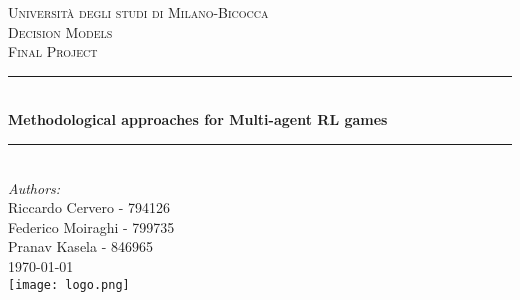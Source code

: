 \begin{titlepage}

\newcommand{\HRule}{\rule{\linewidth}{0.5mm}} %

\center %
 

\textsc{\LARGE Università degli studi di Milano-Bicocca}\\[1cm] %
\textsc{\Large Decision Models}\\[0.3cm] %
\textsc{\large Final Project}\\[0.1cm] %


\HRule \\[0.4cm]
{ \huge \bfseries Methodological approaches for Multi-agent RL games}\\[0.4cm] %
\HRule \\[1.5cm]
 

\large
\emph{Authors:}\\
Riccardo Cervero - 794126\\   
Federico Moiraghi - 799735\\ 
Pranav Kasela - 846965\\[1cm] 

{\large \today}\\[2cm] 


\texttt{[image: logo.png]}\\[1cm] 

\vfill %

\end{titlepage}


